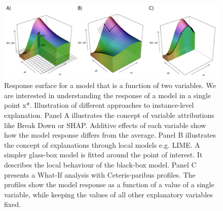 \documentclass[12pt,]{krantz}
\begin{document}
\begin{figure}

{\centering \includegraphics[width=0.99\linewidth]{figure/cuts_techniki_ready} 

}

\caption{Response surface for a model that is a function of two variables. We are interested in understanding the response of a model in a single point x*. Illustration of different approaches to instance-level explanation. Panel A illustrates the concept of variable attributions like Break Down or SHAP. Additive effects of each variable show how the model response differs from the average. Panel B illustrates the concept of explanations through local models e.g. LIME. A simpler glass-box model is fitted around the point of interest. It describes the local behaviour of the black-box model. Panel C presents a What-If analysis with Ceteris-paribus profiles. The profiles show the model response as a function of a value of a single variable, while keeping the values of all other explanatory variables fixed.}\label{fig:cutsTechnikiReady}
\end{figure}


\end{document}
